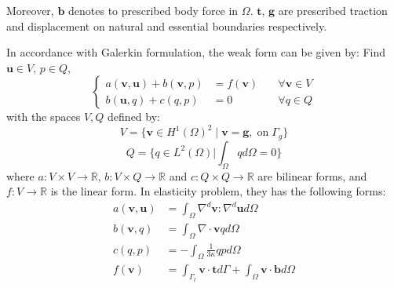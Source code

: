 Moreover, $\boldsymbol b$ denotes to prescribed body force in $\Omega$. $\boldsymbol t$, $\boldsymbol g$ are prescribed traction and displacement on natural and essential boundaries respectively. 

In accordance with Galerkin formulation, the weak form can be given by: 
Find $\boldsymbol u \in V$, $p \in Q$,
\begin{equation}\label{weak_form}
\left \{
\begin{aligned}
    a(\boldsymbol v, \boldsymbol u) + b(\boldsymbol v, p) &= f(\boldsymbol v) \quad &\forall \boldsymbol v \in V \\
    b(\boldsymbol u, q) + c(q,p) &= 0 \quad &\forall q \in Q
\end{aligned}
\right .
\end{equation}
with the spaces $V, Q$ defined by:
\begin{equation}\label{mix_formulation}
V=\{\boldsymbol v \in H^1(\Omega)^2\;\vert\;\boldsymbol v = \boldsymbol g, \; \textrm{on} \; \Gamma_g\}
\end{equation}
\begin{equation}
Q = \{q \in L^2(\Omega) \vert \int_{\Omega} q d\Omega = 0\}
\end{equation}
where $a:V\times V\rightarrow \mathbb R$, $b:V\times Q\rightarrow \mathbb R$ and $c:Q\times Q \rightarrow \mathbb R$ are bilinear forms, and $f:V\rightarrow \mathbb R$ is the linear form. In elasticity problem, they has the following forms:
\begin{align}
    a(\boldsymbol v, \boldsymbol u) &= \int_\Omega \nabla^d \boldsymbol v : \nabla^d \boldsymbol u d\Omega \\
    b(\boldsymbol v, q) &= \int_\Omega \nabla \cdot \boldsymbol v q d\Omega \\
    \label{form_c}
    c(q,p) &= -\int_\Omega \frac{1}{3\kappa} qpd\Omega \\
    f(\boldsymbol v) &= \int_{\Gamma_t} \boldsymbol v \cdot \boldsymbol t d\Gamma + \int_{\Omega} \boldsymbol v \cdot \boldsymbol b d\Omega
\end{align}

